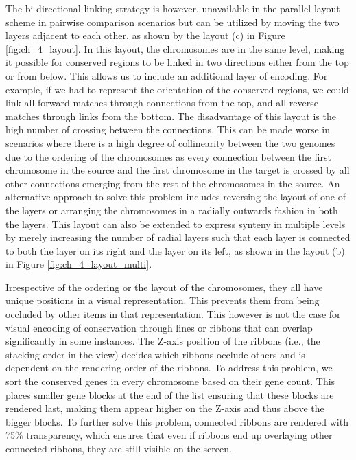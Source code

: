 The bi-directional linking strategy is however, unavailable in the parallel layout scheme in pairwise comparison scenarios but can be utilized by moving the two layers adjacent to each other, as shown by the layout (c) in Figure \ref{fig:ch_4_layout}. In this layout,  the chromosomes are in the same level, making it possible for conserved regions to be linked in two directions either from the top or from below. This allows us to include an additional layer of encoding. For example, if we had to represent the orientation of the conserved regions, we could link all forward matches through connections from the top, and all reverse matches through links from the bottom. The disadvantage of this layout is the high number of crossing between the connections. This can be made worse in scenarios where there is a high degree of collinearity between the two genomes due to the ordering of the chromosomes as every connection between the first chromosome in the source and the first chromosome in the target is crossed by all other connections emerging from the rest of the chromosomes in the source. An alternative approach to solve this problem includes reversing the layout of one of the layers or arranging the chromosomes in a radially outwards fashion in both the layers. This layout can also be extended to express synteny in multiple levels by merely increasing the number of radial layers such that each layer is connected to both the layer on its right and the layer on its left, as shown in the layout (b) in Figure \ref{fig:ch_4_layout_multi}.



Irrespective of the ordering or the layout of the chromosomes, they all have unique positions in a visual representation. This prevents them from being occluded by other items in that representation. This however is not the case for  visual encoding of conservation through lines or ribbons that can overlap significantly in some instances. The Z-axis position of the ribbons (i.e., the stacking order in the view) decides which ribbons occlude others and is dependent on the rendering order of the ribbons. To address this problem, we sort the conserved genes in every chromosome based on their gene count. This places smaller gene blocks at the end of the list ensuring that these blocks are rendered last, making them appear higher on the Z-axis and thus above the bigger blocks. To further solve this problem, connected ribbons are rendered with 75\% transparency, which ensures that even if ribbons end up overlaying other connected ribbons, they are still visible on the screen.

